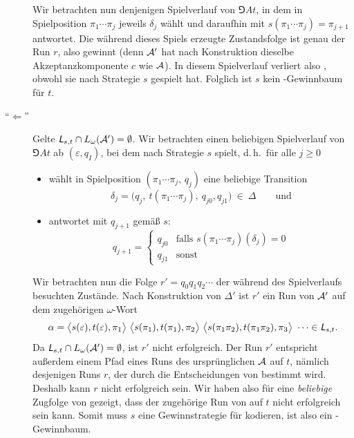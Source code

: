 \documentclass[fontsize=11pt, twoside=false, numbers=autoenddot]{scrbook}
\begin{document}
\begin{description}
    Wir betrachten nun denjenigen Spielverlauf von $\Game{A}{t}$,
    in dem \AUT in Spielposition $\pi_1\cdots\pi_j$ jeweils $\delta_j$ wählt
    und daraufhin \PF mit $s(\pi_1\cdots\pi_j) = \pi_{j+1}$ antwortet.
    Die während dieses Spiels erzeugte Zustandsfolge ist genau der Run $r$,
    also gewinnt \AUT (denn $\mathcal{A}'$ hat nach Konstruktion dieselbe Akzeptanzkomponente $c$
    wie $\mathcal{A}$).
    In diesem Spielverlauf verliert also \PF, obwohl sie nach Strategie $s$ gespielt hat.
    Folglich ist $s$ kein \PF-Gewinnbaum für $t$.
    \par\medskip
  \item[{\boldmath"`$\Leftarrow$"'}]
    Gelte $\textsf{\textit{L}}_{s,t} \cap L_\omega(\mathcal{A}') = \emptyset$.
    Wir betrachten einen beliebigen Spielverlauf von $\Game{A}{t}$ ab
    $(\varepsilon,q_I)$, bei dem
    \PF nach Strategie $s$ spielt, d.\,h.\
    für alle $j \geq 0$
    \begin{itemize}
      \item
        wählt \AUT in Spielposition $(\pi_1\cdots\pi_j,\,q_j)$
        eine beliebige Transition 
        \[
          \delta_j = \Big(q_j,~ t(\pi_1\cdots \pi_j),~ q_{j0}, q_{j1}\Big) ~\in~ \Delta
          \qquad\text{und}
        \]
      \item
        \PF antwortet mit $q_{j+1}$ gemäß $s$:
        \[
          q_{j+1} = 
          \begin{cases}
            q_{j0} & \text{falls~} s(\pi_1\cdots\pi_j)(\delta_j) = 0 \\
            q_{j1} & \text{sonst}
          \end{cases}
        \]
    \end{itemize}
    Wir betrachten nun die Folge $r'=q_0q_1q_2\cdots$ der während des Spielverlaufs
    besuchten Zustände.
    Nach Konstruktion von $\Delta'$ ist $r'$ ein Run von $\mathcal{A}'$ auf dem
    zugehörigen $\omega$-Wort
    \[
      \alpha = 
      \big\langle s(\varepsilon),t(\varepsilon),\pi_1\big\rangle~
      \big\langle s(\pi_1),t(\pi_1),\pi_2\big\rangle~
      \big\langle s(\pi_1\pi_2),t(\pi_1\pi_2),\pi_3\big\rangle~
      \cdots
      \in \textsf{\textit{L}}_{s,t}.
    \]
    Da $\textsf{\textit{L}}_{s,t} \cap L_\omega(\mathcal{A}') = \emptyset$, ist $r'$ nicht erfolgreich.
    Der Run $r'$ entspricht außerdem einem Pfad eines Runs des ursprünglichen $\mathcal{A}$ auf $t$,
    nämlich desjenigen Runs $r$, der durch die Entscheidungen von \AUT bestimmt wird.
    Deshalb kann $r$ nicht erfolgreich sein.
    Wir haben also für eine \emph{beliebige} Zugfolge von \AUT gezeigt, 
    dass der zugehörige Run von \Amc auf $t$ nicht erfolgreich sein kann.
    Somit muss $s$ eine Gewinnstrategie für \PF kodieren,
    ist also ein \PF-Gewinnbaum.
    \qedhere
\end{description}
\end{document}

